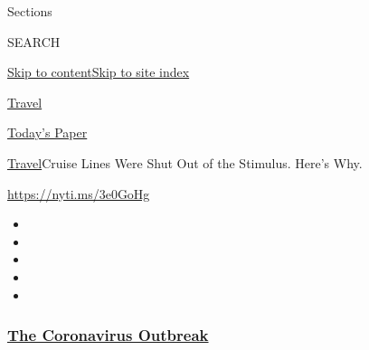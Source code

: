 Sections

SEARCH

\protect\hyperlink{site-content}{Skip to
content}\protect\hyperlink{site-index}{Skip to site index}

\href{https://www.nytimes3xbfgragh.onion/section/travel}{Travel}

\href{https://myaccount.nytimes3xbfgragh.onion/auth/login?response_type=cookie\&client_id=vi}{}

\href{https://www.nytimes3xbfgragh.onion/section/todayspaper}{Today's
Paper}

\href{/section/travel}{Travel}\textbar{}Cruise Lines Were Shut Out of
the Stimulus. Here's Why.

\url{https://nyti.ms/3e0GoHg}

\begin{itemize}
\item
\item
\item
\item
\item
\end{itemize}

\hypertarget{the-coronavirus-outbreak}{%
\subsubsection{\texorpdfstring{\href{https://www.nytimes3xbfgragh.onion/news-event/coronavirus?name=styln-coronavirus-national\&region=TOP_BANNER\&variant=undefined\&block=storyline_menu_recirc\&action=click\&pgtype=Article\&impression_id=42156fe0-e388-11ea-adda-c17bab336bc5}{The
Coronavirus
Outbreak}}{The Coronavirus Outbreak}}\label{the-coronavirus-outbreak}}

